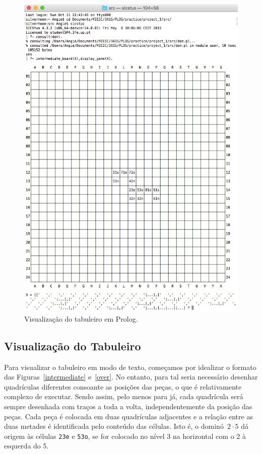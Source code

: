 \documentclass[a4paper]{article}
\begin{document}
\begin{figure}[htbp]
\begin{center}
\includegraphics[scale=0.7]{inter_output.jpg}
\caption{Visualização do tabuleiro em Prolog.}
\label{inter_output}
\end{center}
\end{figure}

\subsection{Visualização do Tabuleiro} 
Para visualizar o tabuleiro em modo de texto, começamos por idealizar o formato das Figuras~\ref{intermediate} e~\ref{over}. No entanto, para tal seria necessário desenhar quadrículas diferentes consoante as posições das peças, o que é relativamente complexo de executar. Sendo assim, pelo menos para já, cada quadrícula será sempre desenhada com traços a toda a volta, independentemente da posição das peças. Cada peça é colocada em duas quadrículas adjacentes e a relação entre as duas metades é identificada pelo conteúdo das células. Isto é, o dominó~$2 \cdot 5$ dá origem às células \verb|23e| e \verb|53o|, se for colocado no nível 3 na horizontal com o 2 à esquerda do 5.
\end{document}
